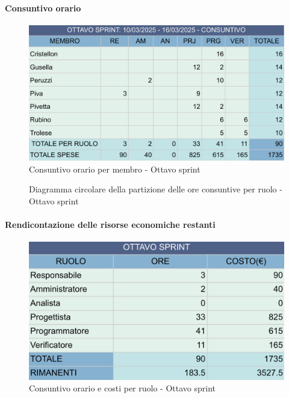 \documentclass[10pt]{article}
\begin{document}
{{{{{{{{{        \paragraph{Consuntivo orario}\mbox{}\vspace{0.4em}
        \begin{figure}[ht]
            \centering
            \includegraphics[width=0.6\linewidth]{consuntivoOreOttavoSprint.png}
            \caption{Consuntivo orario per membro - Ottavo sprint}
            \label{fig:Consuntivo orario per membro - Ottavo sprint}
        \end{figure}

        \begin{figure}[H]
            \centering
            \caption{Diagramma circolare della partizione delle ore consuntive per ruolo - Ottavo sprint}
            \label{fig:Diagramma circolare della partizione delle ore consuntive per ruolo - Ottavo sprint}
        \end{figure}

        \paragraph{Rendicontazione delle risorse economiche restanti}\mbox{}\vspace{0.4em}
        \begin{figure}[H]
            \centering
            \includegraphics[width=0.6\linewidth]{oreCostiOttavoSprint.png}
            \caption{Consuntivo orario e costi per ruolo - Ottavo sprint}
            \label{fig:Consuntivo orario e costi per ruolo - Ottavo sprint}
        \end{figure}
        
}}}}}}}}}
\end{document}
